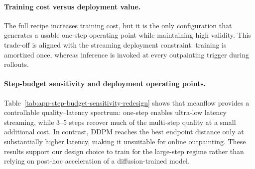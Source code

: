 \documentclass{article}
\theoremstyle{plain}
\theoremstyle{definition}
\theoremstyle{remark}
\begin{document}
\paragraph{Training cost versus deployment value.}
The full recipe increases training cost, but it is the only configuration that generates a usable one-step operating point while maintaining high validity.
This trade-off is aligned with the streaming deployment constraint: training is amortized once, whereas inference is invoked at every outpainting trigger during rollouts.

\paragraph{Step-budget sensitivity and deployment operating points.}
Table~\ref{tab:app-step-budget-sensitivity-redesign} shows that meanflow provides a controllable quality--latency spectrum:
one-step enables ultra-low latency streaming, while 3--5 steps recover much of the multi-step quality at a small additional cost.
In contrast, DDPM reaches the best endpoint distance only at substantially higher latency, making it unsuitable for online outpainting.
These results support our design choice to train for the large-step regime rather than relying on post-hoc acceleration of a diffusion-trained model.
\end{document}
